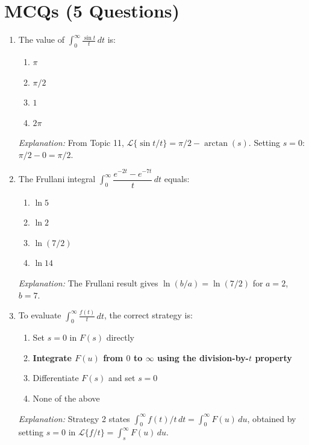 \documentclass[12pt,a4paper]{article}
\begin{document}
\section{MCQs (5 Questions)}

\begin{enumerate}[label=\textbf{MCQ \arabic*.}, leftmargin=*, itemsep=1.6em]

\item The value of $\displaystyle\int_0^\infty \frac{\sin t}{t}\, dt$ is:

\begin{enumerate}[label=(\alph*)]
  \item $\pi$ \quad
  \item \textbf{$\pi/2$} \quad
  \item $1$ \quad
  \item $2\pi$
\end{enumerate}
\textit{Explanation:} From Topic 11, $\mathcal{L}\{\sin t/t\} = \pi/2 - \arctan(s)$.
Setting $s = 0$: $\pi/2 - 0 = \pi/2$.

\item The Frullani integral $\displaystyle\int_0^\infty
      \dfrac{e^{-2t}-e^{-7t}}{t}\, dt$ equals:

\begin{enumerate}[label=(\alph*)]
  \item $\ln 5$ \quad
  \item $\ln 2$ \quad
  \item \textbf{$\ln(7/2)$} \quad
  \item $\ln 14$
\end{enumerate}
\textit{Explanation:} The Frullani result gives $\ln(b/a) = \ln(7/2)$ for
$a = 2$, $b = 7$.

\item To evaluate $\displaystyle\int_0^\infty \frac{f(t)}{t}\, dt$, the correct
      strategy is:

\begin{enumerate}[label=(\alph*)]
  \item Set $s = 0$ in $F(s)$ directly
  \item \textbf{Integrate $F(u)$ from $0$ to $\infty$ using the division-by-$t$ property}
  \item Differentiate $F(s)$ and set $s = 0$
  \item None of the above
\end{enumerate}
\textit{Explanation:} Strategy 2 states $\int_0^\infty f(t)/t\,dt
= \int_0^\infty F(u)\,du$, obtained by setting $s = 0$ in
$\mathcal{L}\{f/t\} = \int_s^\infty F(u)\,du$.


\end{enumerate}
\end{document}
